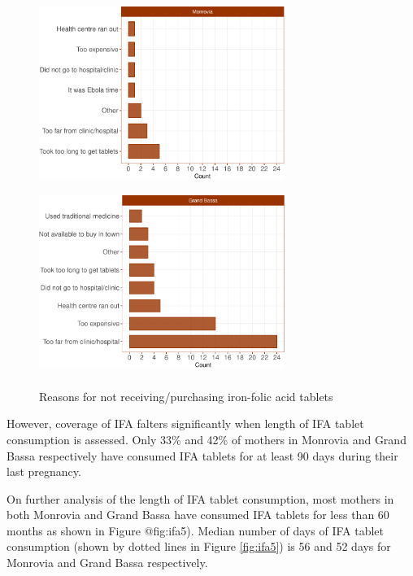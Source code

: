 \documentclass[12pt,a4paper]{article}
\theoremstyle{definition}
\theoremstyle{definition}
\theoremstyle{definition}
\theoremstyle{remark}
\begin{document}
\begin{figure}[H]

{\centering \includegraphics[width=8cm,height=6cm]{liberiaCoverageReport_files/figure-latex/ifa3a-1} \includegraphics[width=8cm,height=6cm]{liberiaCoverageReport_files/figure-latex/ifa3a-2} 

}

\caption{Reasons for not receiving/purchasing iron-folic acid tablets}\label{fig:ifa3a}
\end{figure}

However, coverage of IFA falters significantly when length of IFA tablet
consumption is assessed. Only 33\% and 42\% of mothers in Monrovia and
Grand Bassa respectively have consumed IFA tablets for at least 90 days
during their last pregnancy.

On further analysis of the length of IFA tablet consumption, most
mothers in both Monrovia and Grand Bassa have consumed IFA tablets for
less than 60 months as shown in Figure @fig:ifa5). Median number of days
of IFA tablet consumption (shown by dotted lines in Figure
\ref{fig:ifa5}) is 56 and 52 days for Monrovia and Grand Bassa
respectively.
\end{document}
